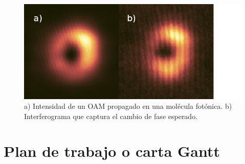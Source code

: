\documentclass{article}
\begin{document}
\begin{figure}[H]
	\centering
	\includegraphics[width=0.7\linewidth]{./media/vortex.png}
	\caption{a) Intensidad de un OAM propagado en una molécula fotónica. b) Interferograma que captura el cambio de fase esperado.}
\end{figure}

\section{Plan de trabajo o carta Gantt}


\renewcommand\refname{Referencias}


\end{document}
